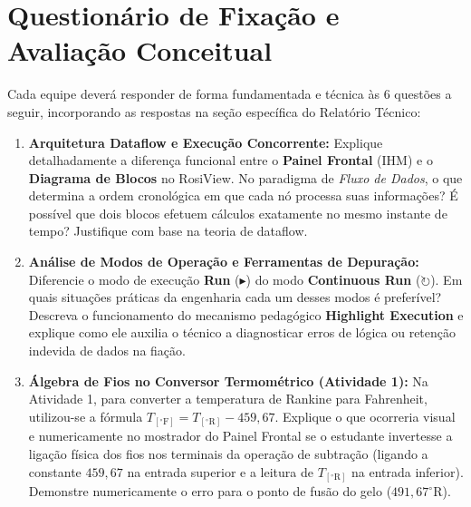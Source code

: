 \documentclass[11pt,a4paper]{article}
\begin{document}
\vspace{-0.15cm}

\section{Questionário de Fixação e Avaliação Conceitual}

Cada equipe deverá responder de forma fundamentada e técnica às 6 questões a seguir, incorporando as respostas na seção específica do Relatório Técnico:

\begin{enumerate}[label=\textbf{Questão \arabic*:}, leftmargin=*, itemsep=4pt, topsep=2pt]
    \item \textbf{Arquitetura Dataflow e Execução Concorrente:}
    Explique detalhadamente a diferença funcional entre o \textbf{Painel Frontal} (IHM) e o \textbf{Diagrama de Blocos} no RosiView. No paradigma de \textit{Fluxo de Dados}, o que determina a ordem cronológica em que cada nó processa suas informações? É possível que dois blocos efetuem cálculos exatamente no mesmo instante de tempo? Justifique com base na teoria de dataflow.

    \item \textbf{Análise de Modos de Operação e Ferramentas de Depuração:}
    Diferencie o modo de execução \textbf{Run} ($\blacktriangleright$) do modo \textbf{Continuous Run} ($\circlearrowright$). Em quais situações práticas da engenharia cada um desses modos é preferível? Descreva o funcionamento do mecanismo pedagógico \textbf{Highlight Execution} e explique como ele auxilia o técnico a diagnosticar erros de lógica ou retenção indevida de dados na fiação.

    \item \textbf{Álgebra de Fios no Conversor Termométrico (Atividade 1):}
    Na Atividade 1, para converter a temperatura de Rankine para Fahrenheit, utilizou-se a fórmula $T_{[^\circ\text{F}]} = T_{[^\circ\text{R}]} - 459{,}67$. Explique o que ocorreria visual e numericamente no mostrador do Painel Frontal se o estudante invertesse a ligação física dos fios nos terminais da operação de subtração (ligando a constante $459{,}67$ na entrada superior e a leitura de $T_{[^\circ\text{R}]}$ na entrada inferior). Demonstre numericamente o erro para o ponto de fusão do gelo ($491{,}67^\circ\text{R}$).


\end{enumerate}
\end{document}
